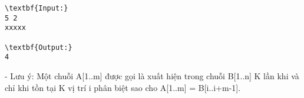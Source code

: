 \begin{verbatim}
\textbf{Input:}
5 2
xxxxx

\textbf{Output:}
4
\end{verbatim}

- Lưu ý: Một chuỗi A[1..m] được gọi là xuất hiện trong chuỗi B[1..n] K lần khi và chỉ khi tồn tại K vị trí i phân biệt sao cho A[1..m] = B[i..i+m-1].